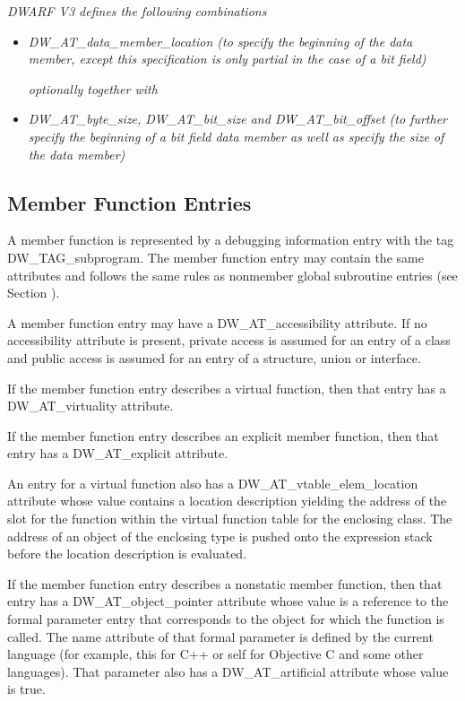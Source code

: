 \textit{DWARF V3 defines the following combinations}

\begin{itemize}
\item \textit{DW\_AT\_data\_member\_location (to specify the beginning
of the data member, except this specification is only partial
in the case of a bit field) }

\textit{optionally together with}

\item \textit{DW\_AT\_byte\_size, DW\-\_AT\-\_bit\-\_size and DW\-\_AT\_bit\_offset
(to further specify the beginning of a bit field data member
as well as specify the size of the data member) }
\end{itemize}

\subsection{Member Function Entries}
\label{chap:memberfunctionentries}

A member function is represented by a debugging information
entry with the tag DW\_TAG\_subprogram. The member function entry
may contain the same attributes and follows the same rules
as non\dash member global subroutine entries 
(see Section ).

A member function entry may have a DW\_AT\_accessibility
attribute. If no accessibility attribute is present, private
access is assumed for an entry of a class and public access
is assumed for an entry of a structure, union or interface.

If the member function entry describes a virtual function,
then that entry has a DW\-\_AT\-\_virtuality attribute.

If the member function entry describes an explicit member
function, then that entry has a DW\-\_AT\-\_explicit attribute.

An entry for a virtual function also has a
DW\_AT\_vtable\_elem\_location attribute whose value contains
a location description yielding the address of the slot
for the function within the virtual function table for the
enclosing class. The address of an object of the enclosing
type is pushed onto the expression stack before the location
description is evaluated.

If the member function entry describes a non\dash static member
function, then that entry has a DW\_AT\_object\_pointer attribute
whose value is a reference to the formal parameter entry
that corresponds to the object for which the function is
called. The name attribute of that formal parameter is defined
by the current language (for example, this for C++ or self
for Objective C and some other languages). That parameter
also has a DW\_AT\_artificial attribute whose value is true.

